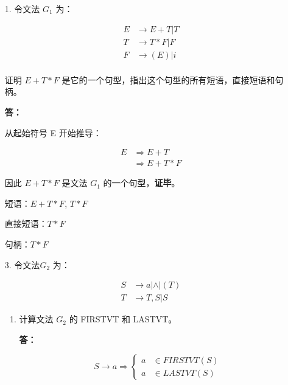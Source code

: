\begin{enumerate}
    \item[1.] 令文法 $G_1$ 为：
    
    \begin{align*}
        E & \to E + T | T \\
        T & \to T * F | F \\
        F & \to (E) | i \\
    \end{align*}
    
    证明 $ E + T * F $ 是它的一个句型，指出这个句型的所有短语，直接短语和句柄。
    
    \textbf{答：}
    
    从起始符号 E 开始推导：
    
    \begin{align*}
        E & \Rightarrow E + T \\
          & \Rightarrow E + T * F
    \end{align*}
    
    因此 $E + T * F$ 是文法 $G_1$ 的一个句型，\textbf{证毕}。
    
    短语：$E + T * F$, $T * F$
    
    直接短语：$T * F$
    
    句柄：$T * F$
    
    \item[3.] 令文法\footnotemark $G_2$ 为：
    
    
    \begin{align*}
        S & \to a | \wedge | (T) \\
        T & \to T, S | S 
    \end{align*}
    
    \begin{enumerate}
        \item 计算文法 $G_2$ 的 FIRSTVT 和 LASTVT。
        
        \textbf{答：}
        
        $$
            S \to a \Rightarrow \left\{
                \begin{array}{rl}
                    a & \in FIRSTVT(S) \\
                    a & \in LASTVT(S) 
                \end{array}
            \right.
        $$
        

\end{enumerate}
\end{enumerate}

